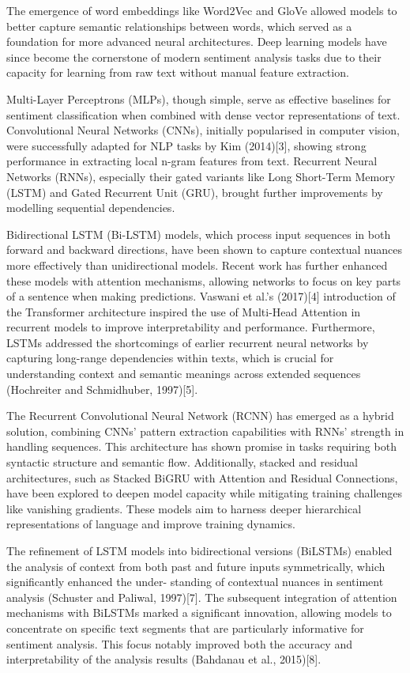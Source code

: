 \documentclass{article}
\begin{document}
The emergence of word embeddings like Word2Vec and GloVe allowed models to better capture semantic relationships between words, which served as a foundation for more advanced neural architectures. Deep learning models have since become the cornerstone of modern sentiment analysis tasks due to their capacity for learning from raw text without manual feature extraction.

Multi-Layer Perceptrons (MLPs), though simple, serve as effective baselines for sentiment classification when combined with dense vector representations of text. Convolutional Neural Networks (CNNs), initially popularised in computer vision, were successfully adapted for NLP tasks by Kim (2014)[3], showing strong performance in extracting local n-gram features from text. Recurrent Neural Networks (RNNs), especially their gated variants like Long Short-Term Memory (LSTM) and Gated Recurrent Unit (GRU), brought further improvements by modelling sequential dependencies.

Bidirectional LSTM (Bi-LSTM) models, which process input sequences in both forward and backward directions, have been shown to capture contextual nuances more effectively than unidirectional models. Recent work has further enhanced these models with attention mechanisms, allowing networks to focus on key parts of a sentence when making predictions. Vaswani et al.'s (2017)[4] introduction of the Transformer architecture inspired the use of Multi-Head Attention in recurrent models to improve interpretability and performance. Furthermore, LSTMs addressed the shortcomings of earlier recurrent neural networks by capturing long-range dependencies within texts, which is crucial for understanding context and semantic meanings across extended sequences (Hochreiter and Schmidhuber, 1997)[5].

The Recurrent Convolutional Neural Network (RCNN) has emerged as a hybrid solution, combining CNNs' pattern extraction capabilities with RNNs' strength in handling sequences. This architecture has shown promise in tasks requiring both syntactic structure and semantic flow. Additionally, stacked and residual architectures, such as Stacked BiGRU with Attention and Residual Connections, have been explored to deepen model capacity while mitigating training challenges like vanishing gradients. These models aim to harness deeper hierarchical representations of language and improve training dynamics.

The refinement of LSTM models into bidirectional versions (BiLSTMs) enabled the analysis of
context from both past and future inputs symmetrically, which significantly enhanced the under-
standing of contextual nuances in sentiment analysis (Schuster and Paliwal, 1997)[7]. The subsequent
integration of attention mechanisms with BiLSTMs marked a significant innovation, allowing models
to concentrate on specific text segments that are particularly informative for sentiment analysis. This
focus notably improved both the accuracy and interpretability of the analysis results (Bahdanau et al.,
2015)[8].
\end{document}
